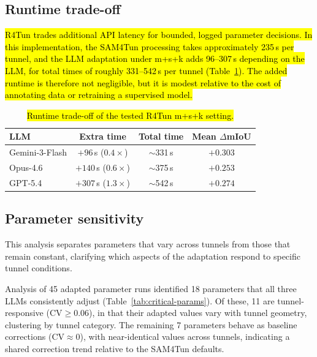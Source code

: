 \documentclass[a4paper,fleqn]{cas-dc}
\begin{document}
{\subsection{Runtime trade-off}\label{sec:runtime-tradeoff}

\hl{R4Tun trades additional API latency for bounded, logged parameter decisions. In this implementation, the SAM4Tun processing takes approximately 235\,s per tunnel, and the LLM adaptation under m+s+k adds 96--307\,s depending on the LLM, for total times of roughly 331--542\,s per tunnel (Table~\ref{tab:runtime-tradeoff}). The added runtime is therefore not negligible, but it is modest relative to the cost of annotating data or retraining a supervised model.}

\begin{table}[ht]
\caption{\hl{Runtime trade-off of the tested R4Tun m+s+k setting.}}\label{tab:runtime-tradeoff}
\begin{tabular*}{\tblwidth}{@{} l c c c @{}}
\toprule
LLM & Extra time & Total time & Mean $\Delta$mIoU \\
\midrule
Gemini-3-Flash & $+96$\,s ($0.4\times$) & $\sim$331\,s & $+0.303$ \\
Opus-4.6 & $+140$\,s ($0.6\times$) & $\sim$375\,s & $+0.253$ \\
GPT-5.4 & $+307$\,s ($1.3\times$) & $\sim$542\,s & $+0.274$ \\
\bottomrule
\end{tabular*}
\end{table}

\subsection{Parameter sensitivity}\label{sec:sensitivity}

This analysis separates parameters that vary across tunnels from those that remain constant, clarifying which aspects of the adaptation respond to specific tunnel conditions.

Analysis of 45 adapted parameter runs identified 18 parameters that all three LLMs consistently adjust (Table~\ref{tab:critical-params}). Of these, 11 are tunnel-responsive ($\text{CV} \geq 0.06$), in that their adapted values vary with tunnel geometry, clustering by tunnel category. The remaining 7 parameters behave as baseline corrections ($\text{CV} \approx 0$), with near-identical values across tunnels, indicating a shared correction trend relative to the SAM4Tun defaults.

}
\end{document}
